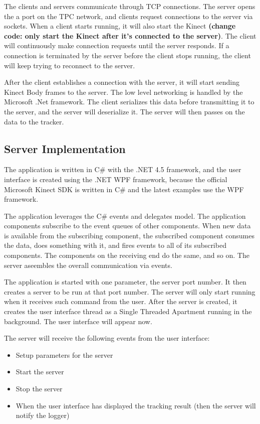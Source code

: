 The clients and servers communicate through TCP connections. The server opens the a port on the TPC network, and clients request connections to the server via sockets. When a client starts running, it will also start the Kinect \textbf{(change code: only start the Kinect after it's connected to the server)}. The client will continuously make connection requests until the server responds. If a connection is terminated by the server before the client stops running, the client will keep trying to reconnect to the server.

After the client establishes a connection with the server, it will start sending Kinect Body frames to the server. The low level networking is handled by the Microsoft .Net framework. The client serializes this data before transmitting it to the server, and the server will deserialize it. The server will then passes on the data to the tracker.

\subsection{Server Implementation}

The application is written in C\# with the .NET 4.5 framework, and the user interface is created using the .NET WPF framework, because the official Microsoft Kinect SDK is written in C\# and the latest examples use the WPF framework. 

The application leverages the C\# events and delegates model. The application components subscribe to the event queues of other components. When new data is available from the subscribing component, the subscribed component consumes the data, does something with it, and fires events to all of its subscribed components. The components on the receiving end do the same, and so on. The server aseembles the overall communication via events.

The application is started with one parameter, the server port number. It then creates a server to be run at that port number. The server will only start running when it receives such command from the user. After the server is created, it creates the user interface thread as a Single Threaded Apartment running in the background. The user interface will appear now.

The server will receive the following events from the user interface:

\begin{itemize}
  \item Setup parameters for the server
  \item Start the server
  \item Stop the server
  \item When the user interface has displayed the tracking result (then the server will notify the logger)
\end{itemize}

